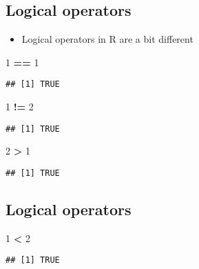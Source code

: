 \documentclass[]{article}
\newenvironment{Shaded}{\begin{snugshade}}{\end{snugshade}}
\newcommand{\DecValTok}[1]{\textcolor[rgb]{0.00,0.00,0.81}{#1}}
\newcommand{\StringTok}[1]{\textcolor[rgb]{0.31,0.60,0.02}{#1}}
\newcommand{\OperatorTok}[1]{\textcolor[rgb]{0.81,0.36,0.00}{\textbf{#1}}}
\providecommand{\tightlist}{%
  \setlength{\itemsep}{0pt}\setlength{\parskip}{0pt}}
\begin{document}
\subsection{Logical operators}\label{logical-operators}

\begin{itemize}
\tightlist
\item
  Logical operators in R are a bit different
\end{itemize}

\begin{Shaded}
\begin{Highlighting}[]
\DecValTok{1} \OperatorTok{==}\StringTok{ }\DecValTok{1}
\end{Highlighting}
\end{Shaded}

\begin{verbatim}
## [1] TRUE
\end{verbatim}

\begin{Shaded}
\begin{Highlighting}[]
\DecValTok{1} \OperatorTok{!=}\StringTok{ }\DecValTok{2}
\end{Highlighting}
\end{Shaded}

\begin{verbatim}
## [1] TRUE
\end{verbatim}

\begin{Shaded}
\begin{Highlighting}[]
\DecValTok{2} \OperatorTok{>}\StringTok{ }\DecValTok{1}
\end{Highlighting}
\end{Shaded}

\begin{verbatim}
## [1] TRUE
\end{verbatim}

\subsection{Logical operators}\label{logical-operators-1}

\begin{Shaded}
\begin{Highlighting}[]
\DecValTok{1} \OperatorTok{<}\StringTok{ }\DecValTok{2}
\end{Highlighting}
\end{Shaded}

\begin{verbatim}
## [1] TRUE
\end{verbatim}
\end{document}
